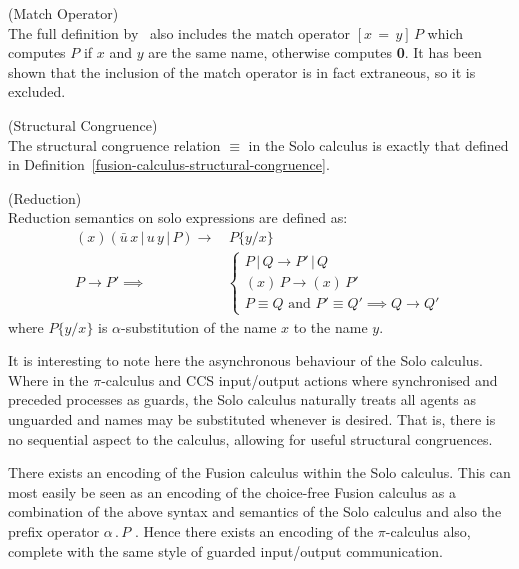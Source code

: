     \begin{remark*}{(Match Operator)\\}
        The full definition by~\cite{solo-calculus} also includes the match operator $[x \, = \, y] \, P$ which computes $P$ if $x$ and $y$ are the same name, otherwise computes \textbf{0}.
        It has been shown that the inclusion of the match operator is in fact extraneous, so it is excluded.
    \end{remark*}


    \begin{definition}{(Structural Congruence)\\}
        The structural congruence relation $\equiv$ in the Solo calculus is exactly that defined in Definition~\ref{fusion-calculus-structural-congruence}.
    \end{definition}


    \begin{definition}{(Reduction)\\}
        Reduction semantics on solo expressions are defined as:
        \begin{align*}
            (x)(\bar{u} \, x \, | \, u \, y \, | \, P) \rightarrow & \, P\{y / x\} \\
            P \rightarrow P' \implies &
            \begin{cases}
                P \, | \, Q \rightarrow P' \, | \, Q \\
                (x) \, P \rightarrow (x) \, P' \\
                P \equiv Q \text{ and } P' \equiv Q' \implies Q \rightarrow Q'
            \end{cases}
        \end{align*}
        where $P\{y / x\}$ is $\alpha$-substitution of the name $x$ to the name $y$.
    \end{definition}
    It is interesting to note here the asynchronous behaviour of the Solo calculus.
    Where in the $\pi$-calculus and CCS input/output actions where synchronised and preceded processes as guards, the Solo calculus naturally treats all agents as unguarded and names may be substituted whenever is desired.
    That is, there is no sequential aspect to the calculus, allowing for useful structural congruences.


    \begin{remark*}
        There exists an encoding of the Fusion calculus within the Solo calculus.
        This can most easily be seen as an encoding of the choice-free Fusion calculus as a combination of the above syntax and semantics of the Solo calculus and also the prefix operator $\alpha \, . \, P$\footnotemark
        .
        Hence there exists an encoding of the $\pi$-calculus also, complete with the same style of guarded input/output communication.
    \end{remark*}





